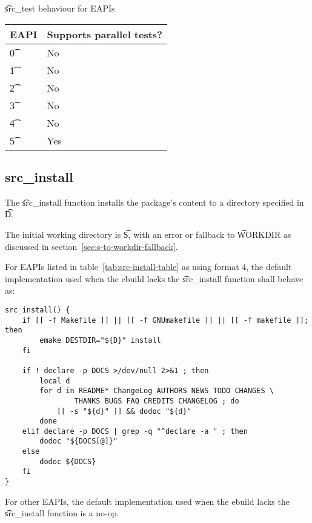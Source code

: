 \begin{centertable}{\t{src\_test} behaviour for EAPIs} \label{tab:src-test-table}
    \begin{tabular}{ l l }
        \toprule
        \multicolumn{1}{c}{\textbf{EAPI}} &
        \multicolumn{1}{c}{\textbf{Supports parallel tests?}} \\
        \midrule
    \t{0} & No \\
    \t{1} & No \\
    \t{2} & No \\
    \t{3} & No \\
    \t{4} & No \\
    \t{5} & Yes \\
    \bottomrule
    \end{tabular}
\end{centertable}

\subsection{src\_install}
\label{sec:src-install-function}

 The \t{src\_install} function installs the package's content to a
directory specified in \t{D}.

The initial working directory is \t{S}, with an error or fallback to \t{WORKDIR} as discussed in
section~\ref{sec:s-to-workdir-fallback}.

 For EAPIs listed in table~\ref{tab:src-install-table} as using format
4, the default implementation used when the ebuild lacks the \t{src\_install} function shall behave
as:

\begin{verbatim}
src_install() {
    if [[ -f Makefile ]] || [[ -f GNUmakefile ]] || [[ -f makefile ]]; then
        emake DESTDIR="${D}" install
    fi

    if ! declare -p DOCS >/dev/null 2>&1 ; then
        local d
        for d in README* ChangeLog AUTHORS NEWS TODO CHANGES \
                THANKS BUGS FAQ CREDITS CHANGELOG ; do
            [[ -s "${d}" ]] && dodoc "${d}"
        done
    elif declare -p DOCS | grep -q "^declare -a " ; then
        dodoc "${DOCS[@]}"
    else
        dodoc ${DOCS}
    fi
}
\end{verbatim}

For other EAPIs, the default implementation used when the ebuild lacks the \t{src\_install} function
is a no-op.

